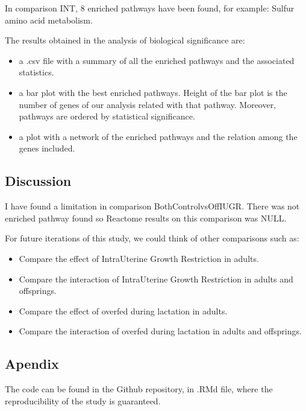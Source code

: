 \documentclass[]{article}
\begin{document}
In comparison INT, 8 enriched pathways have been found, for example:
Sulfur amino acid metabolism.

The results obtained in the analysis of biological significance are:

\begin{itemize}
\item
  a .csv file with a summary of all the enriched pathways and the
  associated statistics.
\item
  a bar plot with the best enriched pathways. Height of the bar plot is
  the number of genes of our analysis related with that pathway.
  Moreover, pathways are ordered by statistical significance.
\item
  a plot with a network of the enriched pathways and the relation among
  the genes included.
\end{itemize}

\subsection{Discussion}\label{discussion}

I have found a limitation in comparison BothControlvsOffIUGR. There was
not enriched pathway found so Reactome results on this comparison was
NULL.

For future iterations of this study, we could think of other comparisons
such as:

\begin{itemize}
\item
  Compare the effect of IntraUterine Growth Restriction in adults.
\item
  Compare the interaction of IntraUterine Growth Restriction in adults
  and offsprings.
\item
  Compare the effect of overfed during lactation in adults.
\item
  Compare the interaction of overfed during lactation in adults and
  offsprings.
\end{itemize}

\subsection{Apendix}\label{apendix}

The code can be found in the Github repository, in .RMd file, where the
reproducibility of the study is guaranteed.
\end{document}
